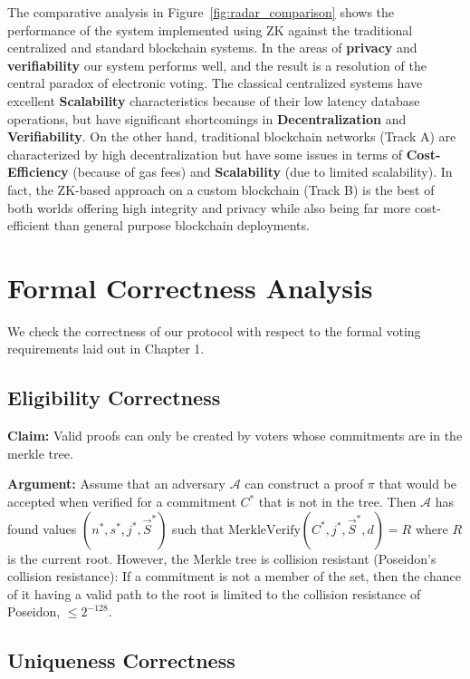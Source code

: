 \documentclass[12pt, a4paper]{report}
\begin{document}
The comparative analysis in Figure~\ref{fig:radar_comparison} shows the performance of the system implemented using ZK against the traditional centralized and standard blockchain systems. In the areas of \textbf{privacy} and \textbf{verifiability} our system performs well, and the result is a resolution of the central paradox of electronic voting. The classical centralized systems have excellent \textbf{Scalability} characteristics because of their low latency database operations, but have significant shortcomings in \textbf{Decentralization} and \textbf{Verifiability}. On the other hand, traditional blockchain networks (Track A) are characterized by high decentralization but have some issues in terms of \textbf{Cost-Efficiency} (because of gas fees) and \textbf{Scalability} (due to limited scalability). In fact, the ZK-based approach on a custom blockchain (Track B) is the best of both worlds offering high integrity and privacy while also being far more cost-efficient than general purpose blockchain deployments.

\newpage
\section{Formal Correctness Analysis}

We check the correctness of our protocol with respect to the formal voting requirements laid out in Chapter 1.

\subsection{Eligibility Correctness}

\textbf{Claim:} Valid proofs can only be created by voters whose commitments are in the merkle tree.

\textbf{Argument:} Assume that an adversary $\mathcal{A}$ can construct a proof $\pi$ that would be accepted when verified for a commitment $C^*$ that is not in the tree. Then $\mathcal{A}$ has found values $(n^*, s^*, j^*, \vec{S}^*)$ such that $\text{MerkleVerify}(C^*, j^*, \vec{S}^*, d) = R$ where $R$ is the current root. However, the Merkle tree is collision resistant (Poseidon's collision resistance): If a commitment is not a member of the set, then the chance of it having a valid path to the root is limited to the collision resistance of Poseidon, $\leq 2^{-128}$.

\subsection{Uniqueness Correctness}
\end{document}
